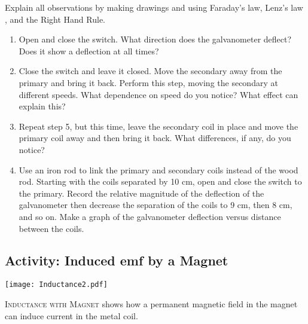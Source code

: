 	Explain all observations by making drawings and using Faraday's law, Lenz's law , and the Right Hand Rule.
\begin{enumerate}[resume]
	 \item Open and close the switch.  What direction does the galvanometer deflect?  Does it show a deflection at all times?  
	\item Close the switch and leave it closed.  Move the secondary away from the primary and bring it back.  Perform this step, moving the secondary at different speeds.  What dependence on speed do you notice?  What effect can explain this?
	\item Repeat step 5, but this time, leave the secondary coil in place and move the primary coil away and then bring it back.  What differences, if any, do you notice?
	\item Use an iron rod to link the primary and secondary coils instead of the wood rod.  Starting with the coils separated by 10 cm, open and close the switch to the primary.  Record the relative magnitude of the deflection of the galvanometer then decrease the separation of the coils to 9 cm, then 8 cm, and so on.  Make a graph of the galvanometer deflection versus distance between the coils. 
\end{enumerate}


\subsection{Activity: Induced emf by a Magnet}


\begin{marginfigure}
	\label{fig:mag-inductance}
	\texttt{[image: Inductance2.pdf]}
	\caption[Magnet Inductance]{\textsc{Inductance with Magnet} shows how a permanent magnetic field in the magnet can induce current in the metal coil.}
\end{marginfigure}

